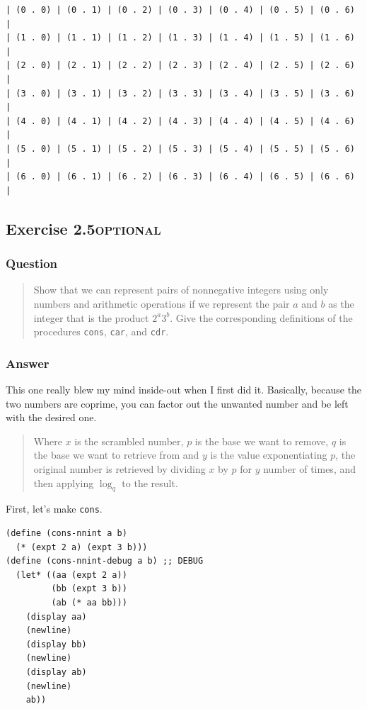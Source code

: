 \documentclass[final,fleqn,titlepage,twoside]{article}
\begin{document}
\begin{verbatim}
| (0 . 0) | (0 . 1) | (0 . 2) | (0 . 3) | (0 . 4) | (0 . 5) | (0 . 6) |
| (1 . 0) | (1 . 1) | (1 . 2) | (1 . 3) | (1 . 4) | (1 . 5) | (1 . 6) |
| (2 . 0) | (2 . 1) | (2 . 2) | (2 . 3) | (2 . 4) | (2 . 5) | (2 . 6) |
| (3 . 0) | (3 . 1) | (3 . 2) | (3 . 3) | (3 . 4) | (3 . 5) | (3 . 6) |
| (4 . 0) | (4 . 1) | (4 . 2) | (4 . 3) | (4 . 4) | (4 . 5) | (4 . 6) |
| (5 . 0) | (5 . 1) | (5 . 2) | (5 . 3) | (5 . 4) | (5 . 5) | (5 . 6) |
| (6 . 0) | (6 . 1) | (6 . 2) | (6 . 3) | (6 . 4) | (6 . 5) | (6 . 6) |
\end{verbatim}

\subsection{Exercise 2.5\hfill{}\textsc{optional}}
\label{sec:orga5c35a2}
\subsubsection{Question}
\label{sec:orgccbf93c}
\begin{quote}
Show that we can represent pairs of nonnegative integers using only numbers and
arithmetic operations if we represent the pair \(a\) and \(b\) as the integer
that is the product \(2^a 3^b\). Give the corresponding definitions of the
procedures \texttt{cons}, \texttt{car}, and \texttt{cdr}.
\end{quote}

\subsubsection{Answer}
\label{sec:org0f3dcb7}
This one really blew my mind inside-out when I first did it. Basically, because
the two numbers are coprime, you can factor out the unwanted number and be left
with the desired one.

\begin{quote}
Where \(x\) is the scrambled number, \(p\) is the base we want to remove, \(q\)
is the base we want to retrieve from and \(y\) is the value exponentiating
\(p\), the original number is retrieved by dividing \(x\) by \(p\) for \(y\)
number of times, and then applying \(\log_{q}\) to the result.
\end{quote}

First, let's make \texttt{cons}.
\begin{verbatim}
(define (cons-nnint a b)
  (* (expt 2 a) (expt 3 b)))
(define (cons-nnint-debug a b) ;; DEBUG
  (let* ((aa (expt 2 a))
         (bb (expt 3 b))
         (ab (* aa bb)))
    (display aa)
    (newline)
    (display bb)
    (newline)
    (display ab)
    (newline)
    ab))
\end{verbatim}
\end{document}
